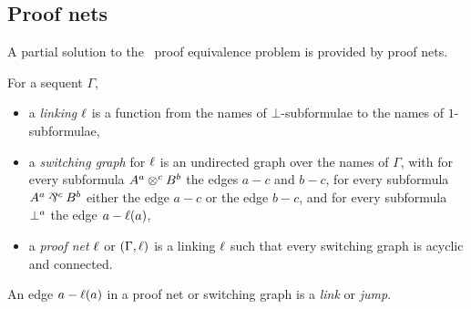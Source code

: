 


\subsection{Proof nets}

A partial solution to the \MLL\ proof equivalence problem is provided by proof nets.


\begin{definition}
\label{def:proof nets}
%
For a sequent $\Gamma$,
\begin{itemize}

	\item
	a \emph{linking} $\links$ is a function from the names of $\bot$-subformulae to the names of $1$-subformulae,

	\item
	a \emph{switching graph} for $\links$ is an undirected graph over the names of $\Gamma$, with for every subformula $\named aA\named c\tn\named bB$ the edges $a-c$ and $b-c$, for every subformula $\named aA\named c\parr\named bB$ either the edge $a-c$ or the edge $b-c$, and for every subformula $\named a\bot$ the edge $a-\links(a)$,

 	\item
	a \emph{proof net} $\links$ or $(\Gamma,\links)$ is a linking $\links$ such that every switching graph is acyclic and connected.

\end{itemize}
\end{definition}


\noindent
An edge $a-\links(a)$ in a proof net or switching graph is a \emph{link} or \emph{jump}.



